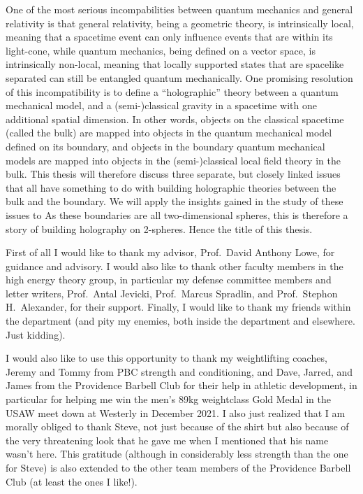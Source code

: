 \documentclass{brownthesis}
\begin{document}
One of the most serious incompabilities between quantum mechanics and general relativity is that general relativity, being a geometric theory, is intrinsically local, meaning that a spacetime event can only influence events that are within its light-cone, while quantum mechanics, being defined on a vector space, is intrinsically non-local, meaning that locally supported states that are spacelike separated can still be entangled quantum mechanically. One promising resolution of this incompatibility is to define a ``holographic'' theory between a quantum mechanical model, and a (semi-)classical gravity in a spacetime with one additional spatial dimension. In other words, objects on the classical spacetime (called the bulk) are mapped into objects in the quantum mechanical model defined on its boundary, and objects in the boundary quantum mechanical models are mapped into objects in the (semi-)classical local field theory in the bulk. This thesis will therefore discuss three separate, but closely linked issues that all have something to do with building holographic theories between the bulk and the boundary. We will apply the insights gained in the study of these issues to  As these boundaries are all two-dimensional spheres, this is therefore a story of building holography on 2-spheres. Hence the title of this thesis.

First of all I would like to thank my advisor, Prof.~David Anthony Lowe, for guidance and advisory. I would also like to thank other faculty members in the high energy theory group, in particular my defense committee members and letter writers, Prof.~Antal Jevicki, Prof.~Marcus Spradlin, and Prof.~Stephon H.~Alexander, for their support. Finally, I would like to thank my friends within the department (and pity my enemies, both inside the department and elsewhere. Just kidding).

I would also like to use this opportunity to thank my weightlifting coaches, Jeremy and Tommy from PBC strength and conditioning, and Dave, Jarred, and James from the Providence Barbell Club for their help in athletic development, in particular for helping me win the men's 89kg weightclass Gold Medal in the USAW meet down at Westerly in December 2021. I also just realized that I am morally obliged to thank Steve, not just because of the shirt but also because of the very threatening look that he gave me when I mentioned that his name wasn't here. This gratitude (although in considerably less strength than the one for Steve) is also extended to the other team members of the Providence Barbell Club (at least the ones I like!).
\end{document}
